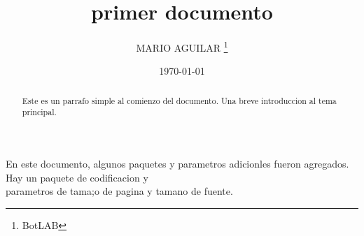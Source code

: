 \documentclass[12pts,letterpaper]{article}
\title{primer documento}
\author{MARIO AGUILAR \thanks{BotLAB}}
\date{\today}
\begin{document}
\begin{titlepage}
    \maketitle
\end{titlepage}

\begin{abstract}
Este es un parrafo simple al comienzo del documento.
Una breve introduccion al tema principal.
\end{abstract}
En este documento, algunos paquetes y parametros adicionles fueron agregados.
Hay un paquete de codificacion y \\parametros de tama;o de pagina y tamano de fuente.
\end{document}
